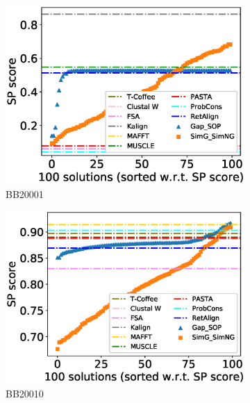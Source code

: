 \begin{figure}[!htbp]
	\centering
	\begin{adjustwidth}{-1.5cm}{-1cm}
		\begin{subfigure}{0.22\textwidth}
			\includegraphics[width=\columnwidth]{Figure/summary/precomputedInit/Balibase/BB20001_pairs_density_single_run_2}
			\caption{BB20001}
		\end{subfigure}	
		\begin{subfigure}{0.22\textwidth}
			\includegraphics[width=\columnwidth]{Figure/summary/precomputedInit/Balibase/BB20010_pairs_density_single_run_2}
			\caption{BB20010}
		\end{subfigure}
		\begin{subfigure}{0.22\textwidth}

\end{subfigure}
\end{adjustwidth}
\end{figure}
